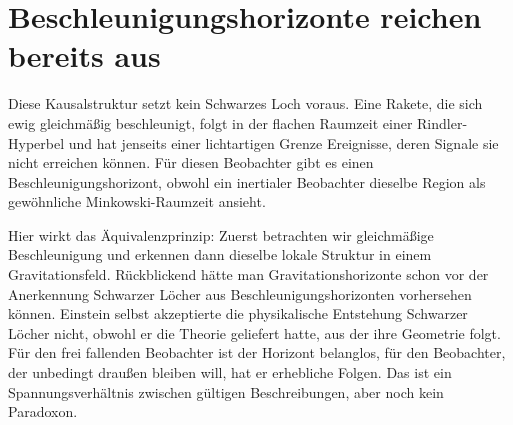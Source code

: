 \begin{classroomqa}
\end{classroomqa}

\section{Beschleunigungshorizonte reichen bereits aus}

Diese Kausalstruktur setzt kein Schwarzes Loch voraus. Eine Rakete, die sich ewig gleichmäßig beschleunigt, folgt in der flachen Raumzeit einer Rindler-Hyperbel und hat jenseits einer lichtartigen Grenze Ereignisse, deren Signale sie nicht erreichen können. Für diesen Beobachter gibt es einen Beschleunigungshorizont, obwohl ein inertialer Beobachter dieselbe Region als gewöhnliche Minkowski-Raumzeit ansieht.

\begin{classroomqa}
\end{classroomqa}

Hier wirkt das Äquivalenzprinzip: Zuerst betrachten wir gleichmäßige Beschleunigung und erkennen dann dieselbe lokale Struktur in einem Gravitationsfeld. Rückblickend hätte man Gravitationshorizonte schon vor der Anerkennung Schwarzer Löcher aus Beschleunigungshorizonten vorhersehen können. Einstein selbst akzeptierte die physikalische Entstehung Schwarzer Löcher nicht, obwohl er die Theorie geliefert hatte, aus der ihre Geometrie folgt. Für den frei fallenden Beobachter ist der Horizont belanglos, für den Beobachter, der unbedingt draußen bleiben will, hat er erhebliche Folgen. Das ist ein Spannungsverhältnis zwischen gültigen Beschreibungen, aber noch kein Paradoxon.

